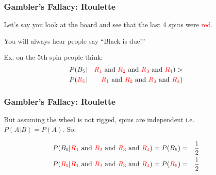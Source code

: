 \documentclass[handout]{beamer}
\newcommand{\blue}[1]{\textcolor{blue2}{#1}}
\begin{document}
\begin{frame}
\frametitle{Gambler's Fallacy: Roulette}
Let's say you look at the board and see that the last 4 spins were \textcolor{red}{red}.\\

\vspace{0.25cm}

\pause You will always hear people say \blue{``Black is due!''}\\

\pause \vspace{0.25cm}

Ex. on the 5th spin people think:
\begin{eqnarray*}
P(B_5 &|& \textcolor{red}{R_1} \mbox{ and } \textcolor{red}{R_2} \mbox{ and } \textcolor{red}{R_3} \mbox{ and } \textcolor{red}{R_4}) > \\
P(\textcolor{red}{R_5} &|& \textcolor{red}{R_1} \mbox{ and } \textcolor{red}{R_2} \mbox{ and } \textcolor{red}{R_3} \mbox{ and } \textcolor{red}{R_4})
\end{eqnarray*}

\end{frame}


\begin{frame}
\frametitle{Gambler's Fallacy: Roulette}
But assuming the wheel is not rigged, spins are independent i.e. $P(A|B) = P(A)$.  So:

\pause \begin{eqnarray*}
P(B_5 | \textcolor{red}{R_1} \mbox{ and } \textcolor{red}{R_2} \mbox{ and } \textcolor{red}{R_3} \mbox{ and } \textcolor{red}{R_4}) = P(B_5) &=& \frac{1}{2} \\
P(\textcolor{red}{R_5} | \textcolor{red}{R_1} \mbox{ and } \textcolor{red}{R_2} \mbox{ and } \textcolor{red}{R_3} \mbox{ and } \textcolor{red}{R_4}) = P(\textcolor{red}{R_5}) &=& \frac{1}{2}
\end{eqnarray*}


\end{frame}
\end{document}

